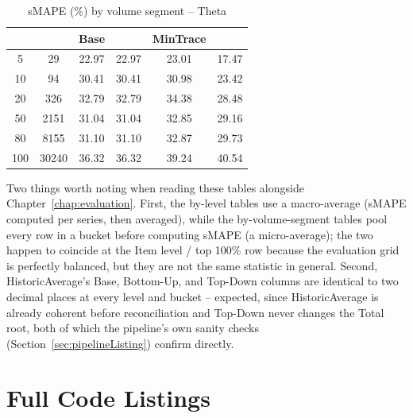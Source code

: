 \begin{table}[H]
	\centering
	\small
	\setlength{\tabcolsep}{4pt}
	\caption{sMAPE (\%) by volume segment -- Theta}
	\label{table:smapeVolumeTheta}
	\begin{tabular}{
			S[table-format=3.0]
			S[table-format=5.0, group-separator={,}]
			S[table-format=2.2]
			S[table-format=2.2]
			S[table-format=2.2]
			S[table-format=2.2]
		}
		\toprule
		{} & 
		{} & 
		{\textbf{Base}} & 
		{} & 
		{\textbf{MinTrace}} & 
		{} \\
		 &    29 & 22.97 & 22.97 & 23.01 & 17.47 \\
		10 &    94 & 30.41 & 30.41 & 30.98 & 23.42 \\
		20 &   326 & 32.79 & 32.79 & 34.38 & 28.48 \\
		50 &  2151 & 31.04 & 31.04 & 32.85 & 29.16 \\
		80 &  8155 & 31.10 & 31.10 & 32.87 & 29.73 \\
		100 & 30240 & 36.32 & 36.32 & 39.24 & 40.54 \\
		\bottomrule
	\end{tabular}
\end{table}

Two things worth noting when reading these tables alongside Chapter~\ref{chap:evaluation}. First, the by-level tables use a macro-average (sMAPE computed per series, then averaged), while the by-volume-segment tables pool every row in a bucket before computing sMAPE (a micro-average); the two happen to coincide at the Item level / top 100\% row because the evaluation grid is perfectly balanced, but they are not the same statistic in general. Second, HistoricAverage's Base, Bottom-Up, and Top-Down columns are identical to two decimal places at every level and bucket -- expected, since HistoricAverage is already coherent before reconciliation and Top-Down never changes the Total root, both of which the pipeline's own sanity checks (Section~\ref{sec:pipelineListing}) confirm directly.

\section{Full Code Listings}
\label{sec:fullCodeListings}


